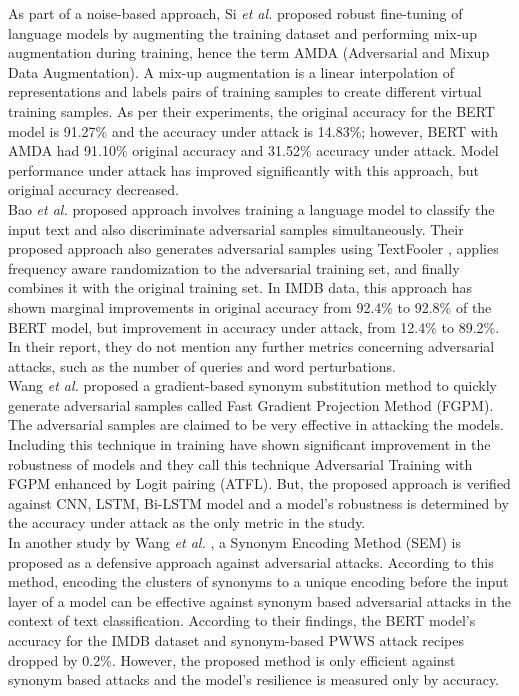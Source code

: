 \documentclass[%
	BCOR=8mm, %
	DIV=12,
	toc=bibliography, %
	toc=listof, %
	oneside, %
	egregdoesnotlikesansseriftitles, %
	]{scrbook}
\begin{document}
As part of a noise-based approach, Si \textit{et al.} \cite{si_better_2021}  proposed robust fine-tuning of language models by augmenting the training dataset and performing mix-up augmentation during training, hence the term AMDA (Adversarial and Mixup Data Augmentation). A mix-up augmentation is a linear interpolation of representations and labels pairs of training samples to create different virtual training samples. As per their experiments, the original accuracy for the BERT model is 91.27\% and the accuracy under attack is 14.83\%; however, BERT with AMDA had 91.10\% original accuracy and 31.52\% accuracy under attack. Model performance under attack has improved significantly with this approach, but original accuracy decreased.\\
Bao \textit{et al.} \cite{bao_defending_2021} proposed approach involves training a language model to classify the input text and also discriminate adversarial samples simultaneously. Their proposed approach also generates adversarial samples using TextFooler \cite{jin_is_2020}, applies frequency aware randomization to the adversarial training set, and finally combines it with the original training set. In IMDB data, this approach has shown marginal improvements in original accuracy from 92.4\% to 92.8\% of the BERT model, but improvement in accuracy under attack, from 12.4\% to 89.2\%. In their report, they do not mention any further metrics concerning adversarial attacks, such as the number of queries and word perturbations.\\
Wang \textit{et al.} \cite{wang_adversarial_2021-1} proposed a gradient-based synonym substitution method to quickly generate adversarial samples called Fast Gradient Projection Method (FGPM). The adversarial samples are claimed to be very effective in attacking the models. Including this technique in training have shown significant improvement in the robustness of models and they call this technique Adversarial Training with FGPM enhanced by Logit pairing (ATFL). But, the proposed approach is verified against CNN, LSTM, Bi-LSTM model and a model's  robustness is determined by the accuracy under attack as the only metric in the study.\\
In another study by Wang \textit{et al.} \cite{wang_natural_2020-1}, a Synonym Encoding Method (SEM) is proposed as a defensive approach against adversarial attacks. According to this method,  encoding the clusters of synonyms to a unique encoding before the input layer of a model can be effective against synonym based adversarial attacks in the context of text classification. According to their findings, the BERT model's accuracy for the IMDB dataset and synonym-based PWWS attack recipes dropped by 0.2\%. However, the proposed method is only efficient against synonym based attacks and the model's resilience is measured only by accuracy.\\
\end{document}
